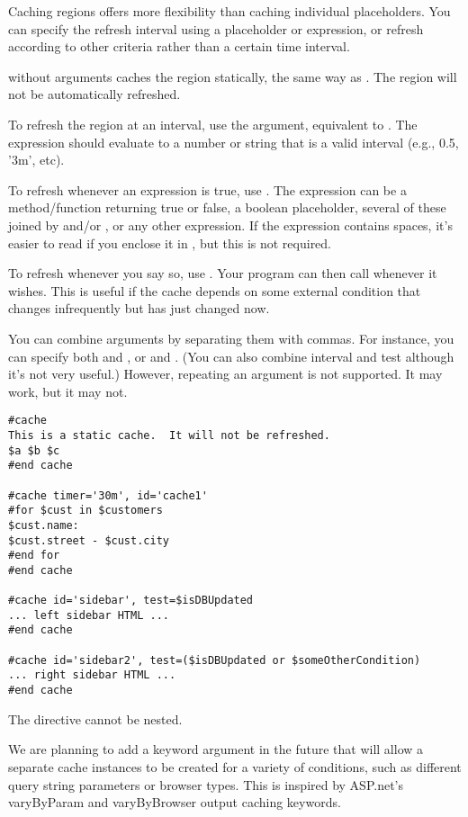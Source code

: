 Caching regions offers more flexibility than caching individual placeholders.
You can specify the refresh interval using a placeholder or
expression, or refresh according to other criteria rather than a certain
time interval.

 without arguments caches the region statically, the same
way as .  The region will not be automatically refreshed.

To refresh the region at an interval, use the  argument,
equivalent to .  The expression should evaluate to a
number or string that is a valid interval (e.g., 0.5, '3m', etc).

To refresh whenever an expression is true, use .
The expression can be a method/function returning true or false, a boolean
placeholder, several of these joined by  and/or , or any
other expression.  If the expression contains spaces, it's easier to
read if you enclose it in \code{()}, but this is not required.

To refresh whenever you say so, use .  Your program can
then call  whenever it wishes.  This is useful if the
cache depends on some external condition that changes infrequently but has just
changed now.

You can combine arguments by separating them with commas.  For instance, you can
specify both  and , or  and .
(You can also combine interval and test although it's not very useful.)
However, repeating an argument is not supported.  It may work, but it may not.

\begin{verbatim}
#cache
This is a static cache.  It will not be refreshed.
$a $b $c
#end cache

#cache timer='30m', id='cache1'
#for $cust in $customers
$cust.name:
$cust.street - $cust.city
#end for
#end cache

#cache id='sidebar', test=$isDBUpdated
... left sidebar HTML ...
#end cache

#cache id='sidebar2', test=($isDBUpdated or $someOtherCondition)
... right sidebar HTML ...
#end cache
\end{verbatim}


The  directive cannot be nested.

We are planning to add a  keyword argument in the future that
will allow a separate cache instances to be created for a variety of conditions,
such as different query string parameters or browser types. This is inspired by
ASP.net's varyByParam and varyByBrowser output caching keywords.

